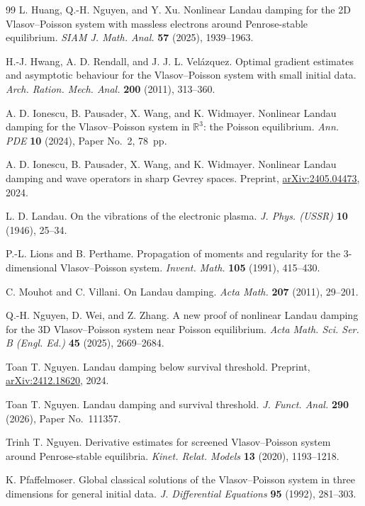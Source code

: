 \documentclass[reqno,11pt]{amsart}
\numberwithin{equation}{section}
\begin{document}
\begin{thebibliography}{99}
	L. Huang, Q.-H. Nguyen, and Y. Xu. Nonlinear Landau damping for the 2D Vlasov--Poisson system with massless electrons around Penrose-stable equilibrium.
	\emph{SIAM J. Math. Anal.} \textbf{57} (2025), 1939--1963.
	
	H.-J. Hwang, A. D. Rendall, and J. J. L. Vel\'azquez. Optimal gradient estimates and asymptotic behaviour for the Vlasov--Poisson system with small initial data.
	\emph{Arch. Ration. Mech. Anal.} \textbf{200} (2011), 313--360.
	
	A. D. Ionescu, B. Pausader, X. Wang, and K. Widmayer. Nonlinear Landau damping for the Vlasov--Poisson system in $\mathbb{R}^3$: the Poisson equilibrium.
	\emph{Ann. PDE} \textbf{10} (2024), Paper No.~2, 78~pp.
	
	A. D. Ionescu, B. Pausader, X. Wang, and K. Widmayer. Nonlinear Landau damping and wave operators in sharp Gevrey spaces.
	Preprint, \href{https://arxiv.org/abs/2405.04473}{arXiv:2405.04473}, 2024.
	
	L. D. Landau. On the vibrations of the electronic plasma.
	\emph{J. Phys. (USSR)} \textbf{10} (1946), 25--34.
	
	P.-L. Lions and B. Perthame. Propagation of moments and regularity for the 3-dimensional Vlasov--Poisson system.
	\emph{Invent. Math.} \textbf{105} (1991), 415--430.
	
	C. Mouhot and C. Villani. On Landau damping.
	\emph{Acta Math.} \textbf{207} (2011), 29--201.
	
	Q.-H. Nguyen, D. Wei, and Z. Zhang. A new proof of nonlinear Landau damping for the 3D Vlasov--Poisson system near Poisson equilibrium.
	\emph{Acta Math. Sci. Ser. B (Engl. Ed.)} \textbf{45} (2025), 2669--2684.
	
	Toan T. Nguyen. Landau damping below survival threshold.
	Preprint, \href{https://arxiv.org/abs/2412.18620}{arXiv:2412.18620}, 2024.
	
	Toan T. Nguyen. Landau damping and survival threshold.
	\emph{J. Funct. Anal.} \textbf{290} (2026), Paper No.~111357.
	
	Trinh T. Nguyen. Derivative estimates for screened Vlasov--Poisson system around Penrose-stable equilibria.
	\emph{Kinet. Relat. Models} \textbf{13} (2020), 1193--1218.
	
	K. Pfaffelmoser. Global classical solutions of the Vlasov--Poisson system in three dimensions for general initial data.
	\emph{J. Differential Equations} \textbf{95} (1992), 281--303.
	

\end{thebibliography}
\end{document}
